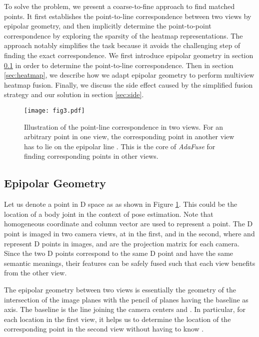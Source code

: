 To solve the problem, we present a coarse-to-fine approach to find matched points. It first establishes the point-to-line correspondence between two views by epipolar geometry, and then implicitly determine the point-to-point correspondence by exploring the sparsity of the heatmap representations. The approach notably simplifies the task because it avoids the challenging step of finding the exact correspondence. We first introduce epipolar geometry in section \ref{sec:epipolar} in order to determine the point-to-line correspondence. Then in section \ref{sec:heatmap}, we describe how we adapt epipolar geometry to perform multiview heatmap fusion. Finally, we discuss the side effect caused by the simplified fusion strategy and our solution in section \ref{sec:side}.

\begin{figure}
    \centering
    \texttt{[image: fig3.pdf]}
    \caption{Illustration of the point-line correspondence in two views. For an arbitrary point  in one view, the corresponding point  in another view has to lie on the epipolar line . This is the core of \emph{AdaFuse} for finding corresponding points in other views.}
    \label{fig:epipolar}
\end{figure}

\subsection{Epipolar Geometry}
\label{sec:epipolar}
{
Let us denote a point in D space as  as shown in Figure \ref{fig:epipolar}. This could be the location of a body joint in the context of pose estimation. Note that homogeneous coordinate and column vector are used to represent a point. The D point is imaged in two camera views, at  in the first, and  in the second, where  and  represent D points in images,  and  are the projection matrix for each camera.
Since the two D points correspond to the same D point and have the same semantic meanings, their features can be safely fused such that each view benefits from the other view.}

{
The epipolar geometry \citep{hartley2003multiple} between two views is essentially the geometry of the intersection of the image planes with the pencil of planes having the baseline as axis. The baseline is the line joining the camera centers  and .  In particular, for each location  in the first view, it helps us to determine the location of the corresponding point  in the second view without having to know . }



